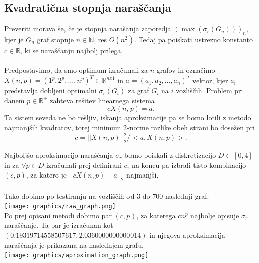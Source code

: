 \documentclass[ letterpaper, titlepage, fleqn]{article}
\begin{document}
\subsection{Kvadratična stopnja naraščanja}
Preveriti morava še, če je stopnja narašanja zaporedja
$(\max(\sigma_r(G_n)))_n$, kjer je $G_n$ graf stopnje $n \in \mathbb{N}$,
res $O(n^2)$. Tedaj pa poiskati ustrezno konstanto $c \in \mathbb{R}$, ki 
se naraščanju najbolj prilega.
\\\\
Predpostavimo, da smo optimum izračunali za $n$ grafov in
označimo $X(n, p) = (1^p, 2^p, \dots, n^p)^T \in \mathbb{R}^{nx1}$ 
in $a = (a_1, a_2, \dots, a_n)^T$ vektor, kjer $a_i$ predstavlja
dobljeni optimalni $\sigma_r(G_i)$ za graf $G_i$ na $i$ vozliščih.
Problem pri danem $p \in \mathbb{R}^{+}$ zahteva rešitev linearnega sistema 
$$cX(n, p) = a.$$
Ta sistem seveda ne bo rešljiv, iskanja aproksimacije pa se bomo
lotili z metodo najmanjših kvadratov, torej minimum $2$-norme
razlike obeh strani bo dosežen pri
$$c = ||X(n, p)||_{2}^2 / <a, X(n, p)>.$$

Najboljšo aproksimacijo naraščanja $\sigma_r$ bomo poiskali 
z diskretizacijo $D \subset [0, 4]$ in za $\forall p \in D$ 
izračunali prej definirani $c$, na koncu pa izbrali tisto kombinacijo
$(c, p)$, za katero je $||cX(n, p) - a||_{2}$ najmanjši.
\\\\
Tako dobimo po testiranju na vozliščih od $3$ do $700$ naslednji graf.\\
\texttt{[image: graphics/raw\_graph.png]} \\
Po prej opisani metodi dobimo par $(c, p)$, za katerega $cn^p$ najbolje opisuje
$\sigma_r$ naraščanje. Ta par je izračunan kot $(0.19319714558507617, 2.0360000000000014)$ in
njegova aproksimacija naraščanja je prikazana na naslednjem grafu.\\
\texttt{[image: graphics/aproximation\_graph.png]}\\
\end{document}
